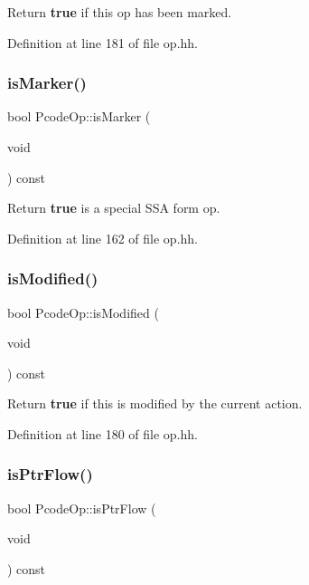 Return {\bfseries{true}} if this op has been marked. 



Definition at line 181 of file op.\+hh.

\mbox{\label{class_pcode_op_a9c76c2a8179e91146c4f382bd0c420d5}} 
\subsubsection{\texorpdfstring{isMarker()}{isMarker()}}
{\footnotesize\ttfamily bool Pcode\+Op\+::is\+Marker (\begin{DoxyParamCaption}\item[{void}]{ }\end{DoxyParamCaption}) const\hspace{0.3cm}{\ttfamily [inline]}}



Return {\bfseries{true}} is a special S\+SA form op. 



Definition at line 162 of file op.\+hh.

\mbox{\label{class_pcode_op_a69de98933ac9ef0e859c45d1462922a9}} 
\subsubsection{\texorpdfstring{isModified()}{isModified()}}
{\footnotesize\ttfamily bool Pcode\+Op\+::is\+Modified (\begin{DoxyParamCaption}\item[{void}]{ }\end{DoxyParamCaption}) const\hspace{0.3cm}{\ttfamily [inline]}}



Return {\bfseries{true}} if this is modified by the current action. 



Definition at line 180 of file op.\+hh.

\mbox{\label{class_pcode_op_ab3039f0ed1b520774755aa97dc015cac}} 
\subsubsection{\texorpdfstring{isPtrFlow()}{isPtrFlow()}}
{\footnotesize\ttfamily bool Pcode\+Op\+::is\+Ptr\+Flow (\begin{DoxyParamCaption}\item[{void}]{ }\end{DoxyParamCaption}) const\hspace{0.3cm}{\ttfamily [inline]}}




